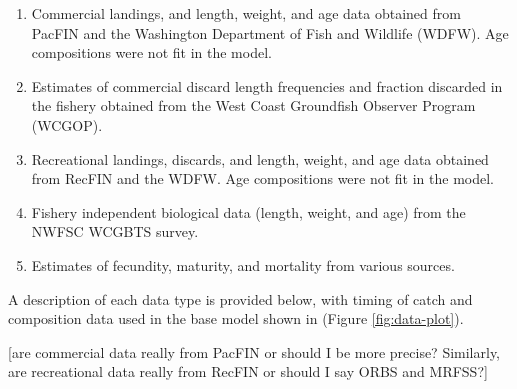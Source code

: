 \documentclass[11pt,
  english,
  a4paper,
]{article}
\begin{document}
\begin{enumerate}
\def\labelenumi{\arabic{enumi}.}
\item

  Commercial landings, and length, weight, and age data obtained from PacFIN and the Washington Department of Fish and Wildlife (WDFW). Age compositions were not fit in the model.

  \tagmcend\tagstructend\tagstructend
\item

  Estimates of commercial discard length frequencies and fraction discarded in the fishery obtained from the West Coast Groundfish Observer Program (WCGOP).

  \tagmcend\tagstructend\tagstructend
\item

  Recreational landings, discards, and length, weight, and age data obtained from RecFIN and the WDFW. Age compositions were not fit in the model.

  \tagmcend\tagstructend\tagstructend
\item

  Fishery independent biological data (length, weight, and age) from the NWFSC WCGBTS survey.

  \tagmcend\tagstructend\tagstructend
\item

  Estimates of fecundity, maturity, and mortality from various sources.

  \tagmcend\tagstructend\tagstructend
\end{enumerate}

\tagstructend


A description of each data type is provided below, with timing of catch and composition data used in the base model shown in (Figure \ref{fig:data-plot}).

\leavevmode\tagmcend\tagstructend\par


{[}are commercial data really from PacFIN or should I be more precise? Similarly, are recreational data really from RecFIN or should I say ORBS and MRFSS?{]}
\end{document}
